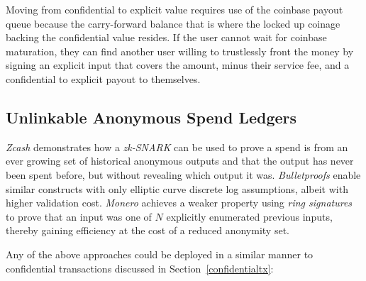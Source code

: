 Moving from confidential to explicit value requires use of the
coinbase payout queue because the carry-forward balance that is where
the locked up coinage backing the confidential value resides.  If the
user cannot wait for coinbase maturation, they can find another user
willing to trustlessly front the money by signing an explicit input
that covers the amount, minus their service fee, and a confidential to
explicit payout to themselves.

\subsection{Unlinkable Anonymous Spend Ledgers}

\emph{Zcash} demonstrates how a \emph{zk-SNARK} can be used to prove a
spend is from an ever growing set of historical anonymous outputs and
that the output has never been spent before, but without revealing
which output it was.  \emph{Bulletproofs} enable similar constructs
with only elliptic curve discrete log assumptions, albeit with higher
validation cost.  \emph{Monero} achieves a weaker property using
\emph{ring signatures} to prove that an input was one of $N$
explicitly enumerated previous inputs, thereby gaining efficiency at
the cost of a reduced anonymity set.

Any of the above approaches could be deployed in a similar manner to
confidential transactions discussed in Section~\ref{confidentialtx}:

